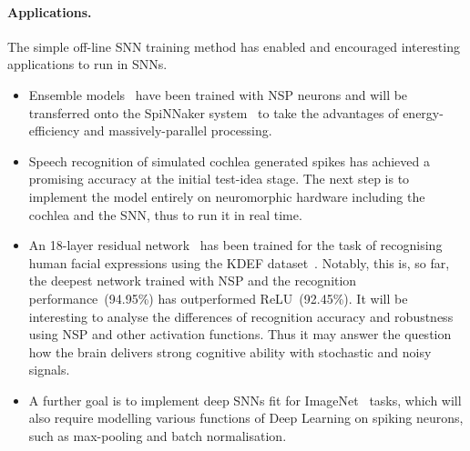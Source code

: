 \paragraph{Applications.}
The simple off-line SNN training method has enabled and encouraged interesting applications to run in SNNs.

\begin{itemize}
	\item Ensemble models~\citep{krogh1995neural} have been trained with NSP neurons and will be transferred onto the SpiNNaker system~\citep{furber2014spinnaker} to take the advantages of energy-efficiency and massively-parallel processing.
	\item Speech recognition of simulated cochlea generated spikes has achieved a promising accuracy at the initial test-idea stage.
	The next step is to implement the model entirely on neuromorphic hardware including the cochlea and the SNN, thus to run it in real time.
	\item An 18-layer residual network~\citep{he2016deep} has been trained for the task of recognising human facial expressions using the KDEF dataset~\citep{lundqvist1998karolinska}.
	Notably, this is, so far, the deepest network trained with NSP and the recognition performance~(94.95\%) has outperformed ReLU~(92.45\%).
	It will be interesting to analyse the differences of recognition accuracy and robustness using NSP and other activation functions.
	Thus it may answer the question how the brain delivers strong cognitive ability with stochastic and noisy signals.
 	\item A further goal is to implement deep SNNs fit for ImageNet~\citep{deng2009imagenet} tasks, which will also require modelling various functions of Deep Learning on spiking neurons, such as max-pooling and batch normalisation. 

\end{itemize}


